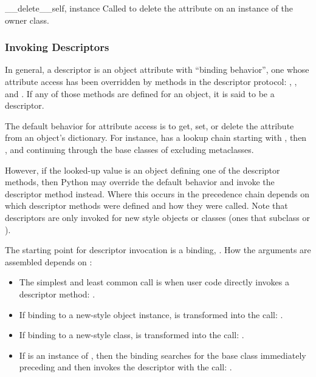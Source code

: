 \begin{methoddesc}[object]{__delete__}{self, instance}
Called to delete the attribute on an instance  of the
owner class.
\end{methoddesc}


\subsubsection{Invoking Descriptors \label{descriptor-invocation}}

In general, a descriptor is an object attribute with ``binding behavior'',
one whose attribute access has been overridden by methods in the descriptor
protocol:  , , and .
If any of those methods are defined for an object, it is said to be a
descriptor.

The default behavior for attribute access is to get, set, or delete the
attribute from an object's dictionary. For instance,  has a
lookup chain starting with , then
, and continuing 
through the base classes of  excluding metaclasses.

However, if the looked-up value is an object defining one of the descriptor
methods, then Python may override the default behavior and invoke the
descriptor method instead.  Where this occurs in the precedence chain depends
on which descriptor methods were defined and how they were called.  Note that
descriptors are only invoked for new style objects or classes
(ones that subclass  or ).

The starting point for descriptor invocation is a binding, .
How the arguments are assembled depends on :

\begin{itemize}
                      
  \item[Direct Call] The simplest and least common call is when user code
    directly invokes a descriptor method:    .

  \item[Instance Binding]  If binding to a new-style object instance,
     is transformed into the call:
    .
                     
  \item[Class Binding]  If binding to a new-style class, 
    is transformed into the call: .

  \item[Super Binding] If  is an instance of ,
    then the binding  searches
     for the base class  immediately
    preceding  and then invokes the descriptor with the call:
    .
                     
\end{itemize}

